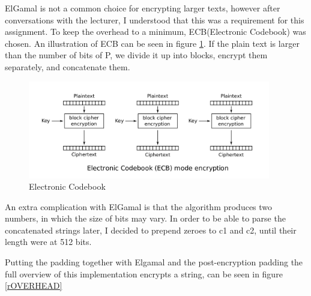 \documentclass{article}
\begin{document}
ElGamal is not a common choice for encrypting larger texts, however after conversations with the lecturer, I understood that this was a requirement for this assignment. To keep the overhead to a minimum, ECB(Electronic Codebook) was chosen. An illustration of ECB can be seen in figure \ref{rECB}. If the plain text is larger than the number of bits of P, we divide it up into blocks, encrypt them separately, and concatenate them.
\begin{figure}[H]
 \centering
  \includegraphics[width=300pt]{img/ECB.png}
 \caption{Electronic Codebook\cite{ECB}}
 \label{rECB}
 \end{figure}

An extra complication with ElGamal is that the algorithm produces two numbers, in which the size of bits may vary. In order to be able to parse the concatenated strings later, I decided to prepend zeroes to c1 and c2, until their length were at 512 bits.

Putting the padding together with Elgamal and the post-encryption padding the full overview of this implementation encrypts a string, can be seen in figure \ref{rOVERHEAD}
\end{document}
